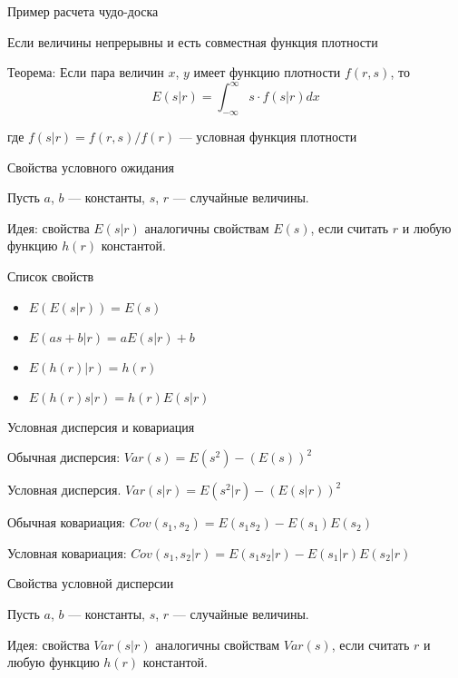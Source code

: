 \documentclass[ignorenonframetext,]{beamer}
\begin{document}
\begin{frame}{Пример расчета чудо-доска}

\end{frame}

\begin{frame}{Если величины непрерывны и есть совместная функция
плотности}

Теорема: Если пара величин $x$, $y$ имеет функцию плотности $f(r,s)$, то
\[
E(s|r)=\int_{-\infty}^{\infty} s \cdot f(s|r) dx
\]

где $f(s|r)=f(r,s)/f(r)$ --- условная функция плотности

\end{frame}

\begin{frame}{Свойства условного ожидания}

Пусть $a$, $b$ --- константы, $s$, $r$ --- случайные величины.

Идея: свойства $E(s|r)$ аналогичны свойствам $E(s)$, если считать $r$ и
любую функцию $h(r)$ константой.

\end{frame}

\begin{frame}{Список свойств}

\begin{itemize}
\item
  $E(E(s|r))=E(s)$
\item
  $E(as+b|r)=aE(s|r)+b$
\item
  $E(h(r)|r)=h(r)$
\item
  $E(h(r)s|r)=h(r)E(s|r)$
\end{itemize}

\end{frame}

\begin{frame}{Условная дисперсия и ковариация}

Обычная дисперсия: $Var(s)=E(s^2)-(E(s))^2$

Условная дисперсия. $Var(s|r)=E(s^2|r)-(E(s|r))^2$

Обычная ковариация: $Cov(s_1,s_2)=E(s_1 s_2)-E(s_1)E(s_2)$

Условная ковариация: $Cov(s_1,s_2|r)=E(s_1 s_2|r)-E(s_1|r)E(s_2|r)$

\end{frame}

\begin{frame}{Свойства условной дисперсии}

Пусть $a$, $b$ --- константы, $s$, $r$ --- случайные величины.

Идея: свойства $Var(s|r)$ аналогичны свойствам $Var(s)$, если считать
$r$ и любую функцию $h(r)$ константой.

\end{frame}
\end{document}
